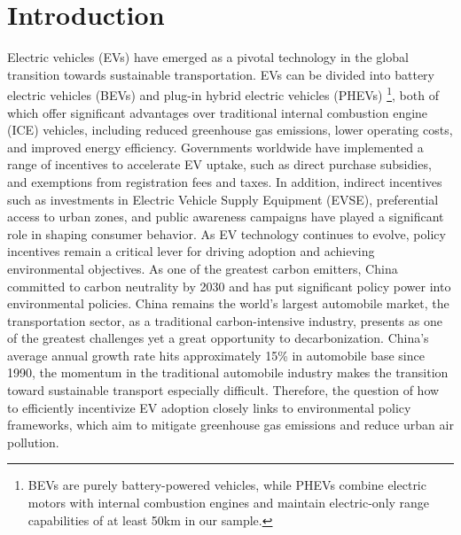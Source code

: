 \documentclass[12pt]{article}
\begin{document}
\section{Introduction}

\hspace*{\parindent}Electric vehicles (EVs) have emerged as a pivotal technology in the global transition towards sustainable transportation. 
EVs can be divided into battery electric vehicles (BEVs) and plug-in hybrid electric vehicles (PHEVs)
\footnote{BEVs are purely battery-powered vehicles, while PHEVs combine electric motors with internal combustion engines and maintain electric-only range capabilities of at least 50km in our sample.}, 
both of which offer significant advantages over traditional internal combustion engine (ICE) vehicles, 
including reduced greenhouse gas emissions, lower operating costs, and improved energy efficiency.
Governments worldwide have implemented a range of incentives to accelerate EV uptake, such as direct purchase subsidies, and exemptions from registration fees and taxes. 
In addition, indirect incentives such as investments in Electric Vehicle Supply Equipment (EVSE), preferential access to urban zones, 
and public awareness campaigns have played a significant role in shaping consumer behavior. 
As EV technology continues to evolve, policy incentives remain a critical lever for driving adoption and achieving environmental objectives. 
As one of the greatest carbon emitters, China committed to carbon neutrality by 2030 and has put significant policy power into environmental policies. 
China remains the world's largest automobile market, the transportation sector, as a traditional carbon-intensive industry, presents as one of the greatest challenges yet a great opportunity to decarbonization. 
China's average annual growth rate hits approximately 15\% in automobile base since 1990, the momentum in the traditional automobile industry makes the transition toward sustainable transport especially difficult. 
Therefore, the question of how to efficiently incentivize EV adoption closely links to environmental policy frameworks, which aim to mitigate greenhouse gas emissions and reduce urban air pollution. 
    
\end{document}
